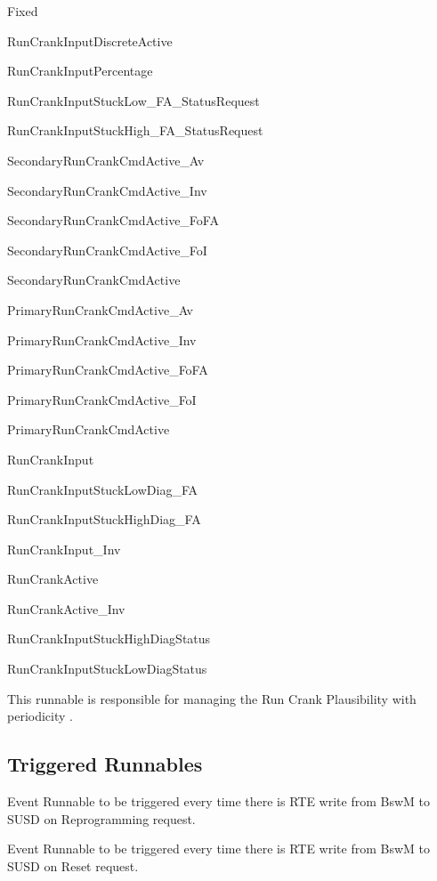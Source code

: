 {
{Fixed}
{}
{RunCrankInputDiscreteActive

RunCrankInputPercentage

RunCrankInputStuckLow_FA_StatusRequest

RunCrankInputStuckHigh_FA_StatusRequest

SecondaryRunCrankCmdActive_Av

SecondaryRunCrankCmdActive_Inv

SecondaryRunCrankCmdActive_FoFA

SecondaryRunCrankCmdActive_FoI

SecondaryRunCrankCmdActive

PrimaryRunCrankCmdActive_Av

PrimaryRunCrankCmdActive_Inv

PrimaryRunCrankCmdActive_FoFA

PrimaryRunCrankCmdActive_FoI

PrimaryRunCrankCmdActive}
{RunCrankInput

RunCrankInputStuckLowDiag_FA

RunCrankInputStuckHighDiag_FA

RunCrankInput_Inv

RunCrankActive

RunCrankActive_Inv

RunCrankInputStuckHighDiagStatus

RunCrankInputStuckLowDiagStatus}
{}
{}
{This runnable is responsible for managing the Run Crank Plausibility with periodicity .}
}
{  }

\clearpage

\subsection{Triggered Runnables}
\label{sec:Runnable}
{
{Event}
{}{}{}{}
{}
{Runnable to be triggered every time there is RTE write from BswM to SUSD on Reprogramming request.}
}
{ }

{
{Event}
{}{}{}{}
{}
{Runnable to be triggered every time there is RTE write from BswM to SUSD on Reset request.}
}
{ }

